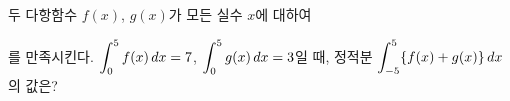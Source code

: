 두 다항함수 $f(x)$, $g(x)$가 모든 실수 $x$에 대하여\par\smallskip{}\par\smallskip\noindent 를 만족시킨다. $\displaystyle\int_{0}^{5} f(x)\mkern3mu dx=7$, $\displaystyle\int_{0}^{5} g(x)\mkern3mu dx=3$일 때, 정적분 $\displaystyle\int_{-5}^{5} \{f(x)+g(x)\}\mkern3mu dx$의 값은?
